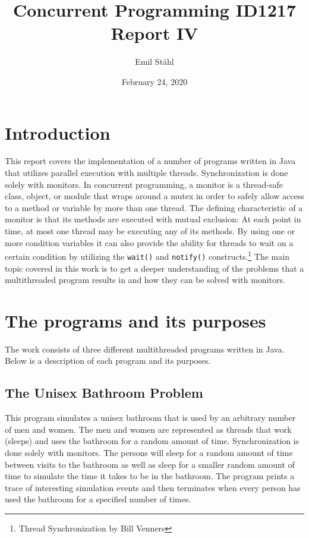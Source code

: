 \documentclass{article}
\title{\textbf{Concurrent Programming ID1217} \\ 
\textbf{Report IV}}
\author{Emil Ståhl}
\date{February 24, 2020}
\begin{document}
\maketitle

\section{Introduction}

This report covers the implementation of a number of programs written in Java that utilizes parallel execution with multiple threads. Synchronization is done solely with monitors. In concurrent programming, a monitor is a thread-safe class, object, or module that wraps around a mutex in order to safely allow access to a method or variable by more than one thread. The defining characteristic of a monitor is that its methods are executed with mutual exclusion: At each point in time, at most one thread may be executing any of its methods. By using one or more condition variables it can also provide the ability for threads to wait on a certain condition by utilizing the \texttt{wait()} and \texttt{notify()} constructs.\footnote[1]{Thread Synchronization by Bill Venners} The main topic covered in this work is to get a deeper understanding of the problems that a multithreaded program results in and how they can be solved with monitors. 

\section{The programs and its purposes}

The work consists of three different multithreaded programs written in Java. Below is a description of each program and its purposes.  

\subsection{The Unisex Bathroom Problem}

This program simulates a unisex bathroom that is used by an arbitrary number of men and women. The men and women are represented as threads that work (sleeps) and uses the bathroom for a random amount of time. Synchronization is done solely with monitors. The persons will sleep for a random amount of time between visits to the bathroom as well as sleep for a smaller random amount of time to simulate the time it takes to be in the bathroom. The program prints a trace of interesting simulation events and then terminates when every person has used the bathroom for a specified number of times. 
\end{document}
